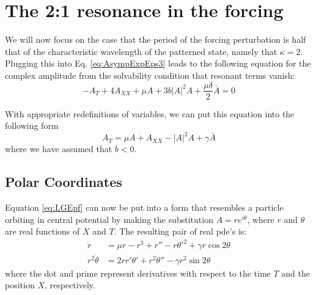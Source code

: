 \documentclass[api,pof,pre,12pt,a4paper]{revtex4-1}
\begin{document}
\section{The 2:1 resonance in the forcing}
We will now focus on the case that the period of the forcing perturbation is half that of the characteristic wavelength of the patterned state, namely that $\kappa=2$.  Plugging this into Eq. \ref{eq:AsympExpEps3} leads to the following equation for the complex amplitude from the solvability condition that resonant terms vanish:
\begin{equation}
-A_T  +4 A_{XX}+\mu A + 3b |A|^2 A+\frac{\mu\delta}{2}\bar{A}=0
\label{eq:LGEpf1}
\end{equation}

With appropriate redefinitions of variables, we can put this equation into the following form
\begin{equation}
A_T  = \mu A + A_{XX} - |A|^2 A+\gamma\bar{A}
\label{eq:LGEpf}
\end{equation}
where we have assumed that $b<0$.

\subsection{Polar Coordinates}
Equation \ref{eq:LGEpf}  can now be put into a form that resembles a particle orbiting in central potential by making the substitution $A=r e^{i\theta}$, where $r$ and $\theta$ are real functions of $X$ and $T$.  The resulting pair of real pde's is:
\begin{subequations}
\begin{align}
\dot{r}&=\mu r - r^3 +r''-r\theta'^2+\gamma r \cos2\theta 
\label{eq:PolarGLEpfr} \\
r^2\dot{\theta}&=2 r r' \theta'+r^2\theta''-\gamma r^2 \sin 2\theta
\label{eq:PolarGLEpfth}
\end{align}
\end{subequations}
where the dot and prime represent derivatives with respect to the time $T$ and the position $X$, respectively.
\end{document}
